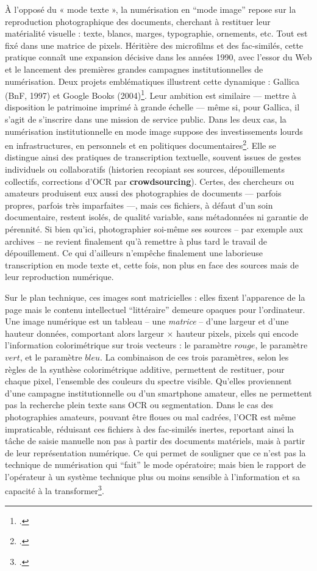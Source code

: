 À l’opposé du « mode texte », la numérisation en \enquote{mode image} repose sur la reproduction photographique des documents, cherchant à restituer leur matérialité visuelle : texte, blancs, marges, typographie, ornements, etc. Tout est fixé dans une matrice de pixels. Héritière des microfilms et des fac-similés, cette pratique connaît une expansion décisive dans les années 1990, avec l’essor du Web et le lancement des premières grandes campagnes institutionnelles de numérisation. Deux projets emblématiques illustrent cette dynamique : Gallica (BnF, 1997) et Google Books (2004)\footcite[][]{bermesbook}. Leur ambition est similaire — mettre à disposition le patrimoine imprimé à grande échelle — même si, pour Gallica, il s'agit de s’inscrire dans une mission de service public. Dans les deux cas, la numérisation institutionnelle en mode image suppose des investissements lourds en infrastructures, en personnels et en politiques documentaires\footcite[][p. 66-88]{claerr}. Elle se distingue ainsi des pratiques de transcription textuelle, souvent issues de gestes individuels ou collaboratifs (historien recopiant ses sources, dépouillements collectifs, corrections d’OCR par \textbf{crowdsourcing}). Certes, des chercheurs ou amateurs produisent eux aussi des photographies de documents — parfois propres, parfois très imparfaites —, mais ces fichiers, à défaut d'un soin documentaire, restent isolés, de qualité variable, sans métadonnées ni garantie de pérennité. Si bien qu'ici, photographier soi-même ses sources -- par exemple aux archives -- ne revient finalement qu'à remettre à plus tard le travail de dépouillement. Ce qui d'ailleurs n'empêche finalement une laborieuse transcription en mode texte et, cette fois, non plus en face des sources mais de leur reproduction numérique. 

Sur le plan technique, ces images sont matricielles : elles fixent l’apparence de la page mais le contenu intellectuel \enquote{littéraire} demeure opaques pour l’ordinateur. Une image numérique est un tableau -- une \emph{matrice} -- d'une largeur et d'une hauteur données, comportant alors largeur $\times$ hauteur pixels, pixels qui encode l'information colorimétrique sur trois vecteurs : le paramètre $rouge$, le paramètre $vert$, et le paramètre $bleu$. La combinaison de ces trois paramètres, selon les règles de la synthèse colorimétrique additive, permettent de restituer, pour chaque pixel, l'ensemble des couleurs du spectre visible. Qu’elles proviennent d’une campagne institutionnelle ou d’un smartphone amateur, elles ne permettent pas la recherche plein texte sans OCR ou segmentation. Dans le cas des photographies amateurs, pouvant être floues ou mal cadrées, l’OCR est même impraticable, réduisant ces fichiers à des fac-similés inertes, reportant ainsi la tâche de saisie manuelle non pas à partir des documents matériels, mais à partir de leur représentation numérique. Ce qui permet de souligner que ce n'est pas la technique de numérisation qui \enquote{fait} le mode opératoire; mais bien le rapport de l'opérateur à un système technique plus ou moins sensible à l'information et sa capacité à la transformer\footcite[][]{meot}.

